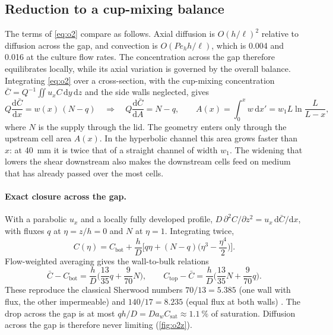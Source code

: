 \documentclass[11pt,a4paper]{article}
\newcommand{\Csat}{C_{\mathrm{sat}}}
\newcommand{\Cb}{\bar C}
\newcommand{\Cbot}{C_{\mathrm{bot}}}
\newcommand{\Ctop}{C_{\mathrm{top}}}
\newcommand{\dd}{\mathrm{d}}
\newcommand{\Pe}{\mathit{Pe}}
\newcommand{\Da}{\mathit{Da}}
\begin{document}
\subsection{Reduction to a cup-mixing balance}

The terms of \cref{eq:o2} compare as follows. Axial diffusion is $O(h/\ell)^2$ relative to diffusion across the gap, and convection is $O(\Pe_h h/\ell)$, which is 0.004 and 0.016 at the culture flow rates. The concentration across the gap therefore equilibrates locally, while its axial variation is governed by the overall balance. Integrating \cref{eq:o2} over a cross-section, with the cup-mixing concentration $\Cb=Q^{-1}\iint u_xC\,\dd y\,\dd z$ and the side walls neglected, gives
\begin{equation}
Q\frac{\dd\Cb}{\dd x}=w(x)\,(N-q)
\quad\Longrightarrow\quad
Q\frac{\dd\Cb}{\dd A}=N-q,\qquad A(x)=\int_0^xw\,\dd x'=w_1L\ln\frac{L}{L-x},
\label{eq:cup}
\end{equation}
where $N$ is the supply through the lid. The geometry enters only through the upstream cell area $A(x)$. In the hyperbolic channel this area grows faster than $x$: at \SI{40}{mm} it is twice that of a straight channel of width $w_1$. The widening that lowers the shear downstream also makes the downstream cells feed on medium that has already passed over the most cells.

\paragraph{Exact closure across the gap.} With a parabolic $u_x$ and a locally fully developed profile, $D\,\partial^2C/\partial z^2=u_x\,\dd\Cb/\dd x$, with fluxes $q$ at $\eta=z/h=0$ and $N$ at $\eta=1$. Integrating twice,
\begin{equation}
C(\eta)=\Cbot+\frac hD\Big[q\eta+(N-q)\Big(\eta^3-\frac{\eta^4}{2}\Big)\Big].
\end{equation}
Flow-weighted averaging gives the wall-to-bulk relations
\begin{equation}
\Cb-\Cbot=\frac hD\Big(\frac{13}{35}q+\frac{9}{70}N\Big),\qquad \Ctop-\Cb=\frac hD\Big(\frac{13}{35}N+\frac{9}{70}q\Big).
\label{eq:closure}
\end{equation}
These reproduce the classical Sherwood numbers $70/13=5.385$ (one wall with flux, the other impermeable) and $140/17=8.235$ (equal flux at both walls) \citep{ShahLondon1978}. The drop across the gap is at most $qh/D=\Da_w\Csat\approx\SI{1.1}{\percent}$ of saturation. Diffusion across the gap is therefore never limiting (\cref{fig:o2z}).
\end{document}
